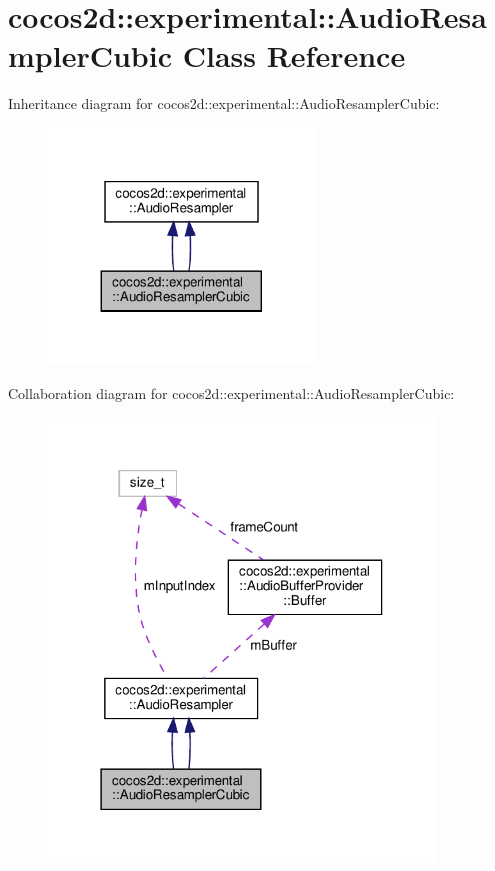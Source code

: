 \hypertarget{classcocos2d_1_1experimental_1_1AudioResamplerCubic}{}\section{cocos2d\+:\+:experimental\+:\+:Audio\+Resampler\+Cubic Class Reference}
\label{classcocos2d_1_1experimental_1_1AudioResamplerCubic}


Inheritance diagram for cocos2d\+:\+:experimental\+:\+:Audio\+Resampler\+Cubic\+:
\nopagebreak
\begin{figure}[H]
\begin{center}
\leavevmode
\includegraphics[width=200pt]{classcocos2d_1_1experimental_1_1AudioResamplerCubic__inherit__graph}
\end{center}
\end{figure}


Collaboration diagram for cocos2d\+:\+:experimental\+:\+:Audio\+Resampler\+Cubic\+:
\nopagebreak
\begin{figure}[H]
\begin{center}
\leavevmode
\includegraphics[width=291pt]{classcocos2d_1_1experimental_1_1AudioResamplerCubic__coll__graph}
\end{center}
\end{figure}
